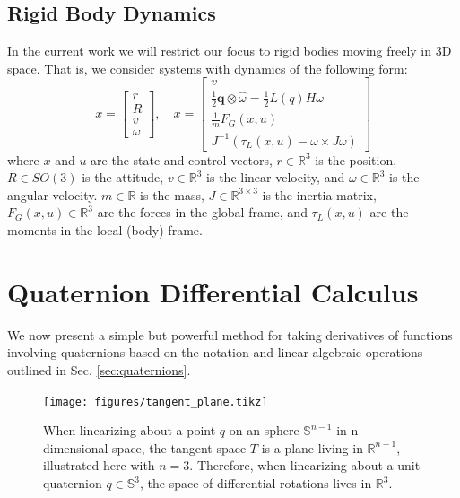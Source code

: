 \documentclass[letterpaper, 10 pt, conference]{ieeeconf}  %
\newcommand{\half}{\frac{1}{2}}
\newcommand{\R}{\mathbb{R}}
\newcommand{\Q}{\mathbb{S}^3}
\newcommand{\q}{\textbf{q}}
\begin{document}
    \subsection{Rigid Body Dynamics} \label{sec:rigidbody_dynamics}
        In the current work we will restrict our focus to rigid bodies moving freely in 3D 
        space. That is, we consider systems with dynamics of the following form:
        \begin{equation} \label{eq:rigid_body_dynamics}
            x = \begin{bmatrix} r \\ R \\ v \\ \omega \end{bmatrix}, \quad 
            \dot{x} = \begin{bmatrix} 
                v \\ 
                \half \q \otimes \hat{\omega} = \half L(q) H \omega \\ 
                \frac{1}{m} F_G(x,u) \\ 
                J^{-1}(\tau_L(x,u) - \omega \times J \omega) 
            \end{bmatrix}
        \end{equation}
        where $x$ and $u$ are the state and control vectors, $r \in \R^3$ is the position, 
        $R \in SO(3)$ is the attitude, $v \in \R^3$ is the linear velocity, and 
        $\omega \in \R^3$ is the angular velocity. $m \in \R$ is the mass, 
        $J \in \R^{3\times3}$ is the inertia matrix, $F_G(x,u) \in \R^3$ are the forces in the 
        global frame, and $\tau_L(x,u)$ are the moments in the local (body) frame.

\section{Quaternion Differential Calculus} \label{sec:Quaternion_Calculus}
    We now present a simple but powerful method for taking derivatives of functions 
    involving quaternions based on the notation and linear algebraic operations outlined 
    in Sec. \ref{sec:quaternions}.
    
    \begin{figure}
        \centering
        \texttt{[image: figures/tangent\_plane.tikz]}
        \caption{
            When linearizing about a point $q$ on an sphere $\mathbb{S}^{n-1}$ in 
            n-dimensional space, the tangent space $T$ is a plane living in $\R^{n-1}$, 
            illustrated here with $n=3$. Therefore, when linearizing about a unit 
            quaternion $q \in \Q$, the space of differential rotations lives in $\R^3$.
        }
        \label{fig:tangent_plane}
    \end{figure}
        
\end{document}
